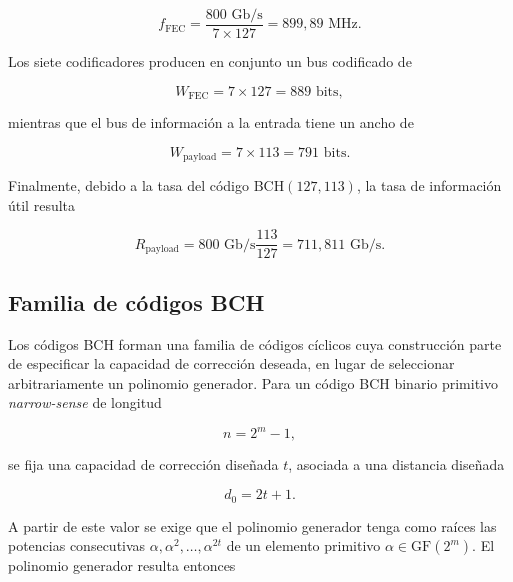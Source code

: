 \documentclass[10pt,a4paper]{article}
\begin{document}
\begin{equation}
    f_{\mathrm{FEC}}
    =
    \frac{800\text{ Gb/s}}{7\times127}
    =
    899{,}89\text{ MHz}.
\end{equation}

Los siete codificadores producen en conjunto un bus codificado de

\begin{equation}
    W_{\mathrm{FEC}}
    =
    7\times127
    =
    889\text{ bits},
\end{equation}

mientras que el bus de información a la entrada tiene un ancho de

\begin{equation}
    W_{\mathrm{payload}}
    =
    7\times113
    =
    791\text{ bits}.
\end{equation}

Finalmente, debido a la tasa del código BCH$(127,113)$, la tasa de información
útil resulta

\begin{equation}
    R_{\mathrm{payload}}
    =
    800\text{ Gb/s}\frac{113}{127}
    =
    711{,}811\text{ Gb/s}.
    \label{eq:tasa-util}
\end{equation}

\subsection{Familia de códigos BCH}

Los códigos BCH forman una familia de códigos cíclicos cuya construcción parte
de especificar la capacidad de corrección deseada, en lugar de seleccionar
arbitrariamente un polinomio generador. Para un código BCH binario primitivo
\textit{narrow-sense} de longitud

\begin{equation}
    n = 2^m-1,
\end{equation}

se fija una capacidad de corrección diseñada $t$, asociada a una distancia
diseñada

\begin{equation}
    d_0 = 2t+1.
\end{equation}

A partir de este valor se exige que el polinomio generador tenga como raíces
las potencias consecutivas $\alpha,\alpha^2,\ldots,\alpha^{2t}$ de un elemento
primitivo $\alpha\in\mathrm{GF}(2^m)$. El polinomio generador resulta entonces
\end{document}

